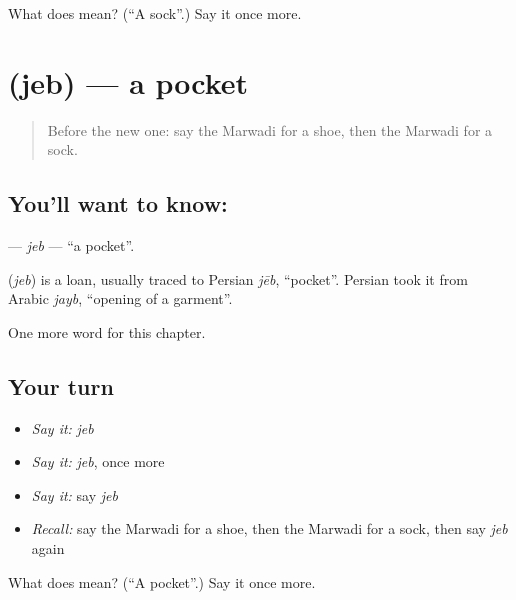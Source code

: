 \begin{tcolorbox}[breakable,colback=teal!4,colframe=teal!35!black,title={Before you move on}]
What does  mean? (\textquotedblleft{}A sock\textquotedblright{}.) Say it once more.
\end{tcolorbox}
\section[\texorpdfstring{\mw{जेब} (jeb)}{जेब (jeb)}]{ (jeb) — a pocket}

\label{lesson:MW-C85-jeb}



\begin{quote}
Before the new one: say the Marwadi for a shoe, then the Marwadi for a sock.
\end{quote}

\subsection*{You'll want to know: }
\textbf{} — \emph{jeb} — \textquotedblleft{}a pocket\textquotedblright{}.

\begin{cousinweb}
\textbf{} (\emph{jeb}) is a loan, usually traced to Persian \emph{jēb}, \textquotedblleft{}pocket\textquotedblright{}. Persian took it from Arabic \emph{jayb}, \textquotedblleft{}opening of a garment\textquotedblright{}.
\end{cousinweb}

\begin{grammarlens}[title={What you've built}]
One more word for this chapter.
\end{grammarlens}

\subsection*{Your turn}
\begin{itemize}
\raggedright
  \item \emph{Say it:} \emph{jeb}
  \item \emph{Say it:} \emph{jeb}, once more
  \item \emph{Say it:} say \emph{jeb}
  \item \emph{Recall:} say the Marwadi for a shoe, then the Marwadi for a sock, then say \emph{jeb} again
\end{itemize}

\begin{tcolorbox}[breakable,colback=teal!4,colframe=teal!35!black,title={Before you move on}]
What does  mean? (\textquotedblleft{}A pocket\textquotedblright{}.) Say it once more.
\end{tcolorbox}
